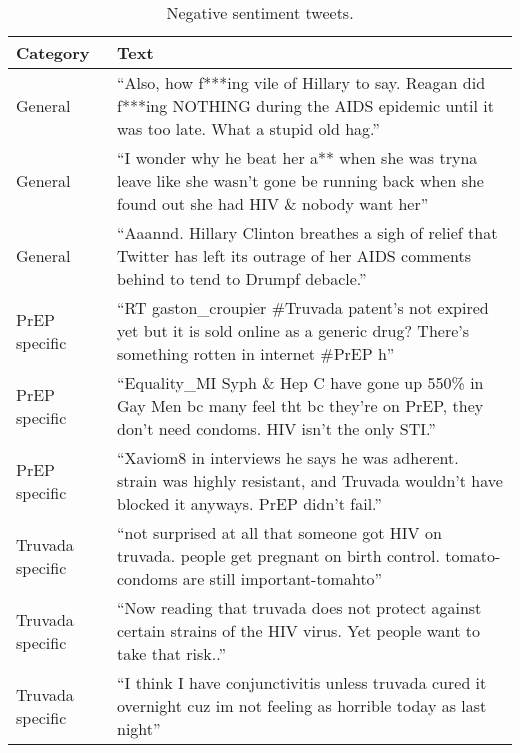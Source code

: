 \begin{table*}
\centering
\caption{Negative sentiment tweets.}
\begin{tabular}{|p{2.5cm}|p{10cm}|} \hline
Category & Text\\ \hline
General & ``Also, how f***ing vile of Hillary to say. Reagan did f***ing NOTHING during the AIDS epidemic until it was too late. What a stupid old hag.''\\ \hline
General & ``I wonder why he beat her a** when she was tryna leave like she wasn't gone be running back when she found out she had HIV \& nobody want her''\\ \hline
General & ``Aaannd. Hillary Clinton breathes a sigh of relief that Twitter has left its outrage of her AIDS comments behind to tend to Drumpf debacle.''\\ \hline

PrEP specific & ``RT gaston\_croupier \#Truvada patent's not expired yet but it is sold online as a generic drug? There's something rotten in internet \#PrEP h''\\ \hline
PrEP specific & ``Equality\_MI Syph \& Hep C have gone up 550\% in Gay Men bc many feel tht bc they're on PrEP, they don't need condoms. HIV isn't the only STI.''\\ \hline
PrEP specific & ``Xaviom8 in interviews he says he was adherent. strain was highly resistant, and Truvada wouldn't have blocked it anyways. PrEP didn't fail.''\\ \hline

Truvada specific & ``not surprised at all that someone got HIV on truvada. people get pregnant on birth control. tomato-condoms are still important-tomahto''\\ \hline
Truvada specific & ``Now reading that truvada does not protect against certain strains of the HIV virus. Yet people want to take that risk..''\\ \hline
Truvada specific & ``I think I have conjunctivitis unless truvada cured it overnight cuz im not feeling as horrible today as last night''\\ \hline

\hline\end{tabular}
\label{tbl:neg}
\end{table*}


